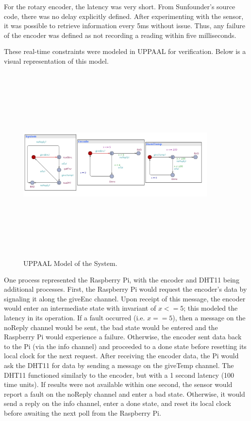 \documentclass[letterpaper, 12pt]{article}
\begin{document}
\indent For the rotary encoder, the latency was very short.  From Sunfounder's source code, there was no delay explicitly defined.  After experimenting with the sensor, it was possible to retrieve information every 5ms without issue.  Thus, any failure of the encoder was defined as not recording a reading within five milliseconds.

These real-time constraints were modeled in UPPAAL for verification.  Below is a visual representation of this model.
~\newline 
\begin{figure}[H]
	\centering
	\includegraphics[width=10cm,height=10cm,keepaspectratio]{system.png}
	\caption[Model]{UPPAAL Model of the System.}
	\label{fig:model}
\end{figure}
\indent One process represented the Raspberry Pi, with the encoder and DHT11 being additional processes.  First, the Raspberry Pi would request the encoder's data by signaling it along the giveEnc channel.  Upon receipt of this message, the encoder would enter an intermediate state with invariant of $x <= 5$; this modeled the latency in its operation.  If a fault occurred (i.e. $x == 5$), then a message on the noReply channel would be sent, the bad state would be entered and the Raspberry Pi would experience a failure.  Otherwise, the encoder sent data back to the Pi (via the info channel) and proceeded to a done state before resetting its local clock for the next request.  After receiving the encoder data, the Pi would ask the DHT11 for data by sending a message on the giveTemp channel.  The DHT11 functioned similarly to the encoder, but with a 1 second latency (100 time units).  If results were not available within one second, the sensor would report a fault on the noReply channel and enter a bad state.  Otherwise, it would send a reply on the info channel, enter a done state, and reset its local clock before awaiting the next poll from the Raspberry Pi.
\end{document}
